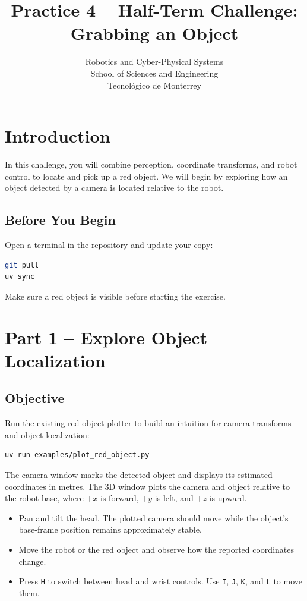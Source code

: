 \documentclass[11pt,a4paper]{article}
\title{\textbf{Practice 4 -- Half-Term Challenge: Grabbing an Object}}
\author{
    Robotics and Cyber-Physical Systems \\
    School of Sciences and Engineering \\
    Tecnol\'ogico de Monterrey
}
\date{}
\begin{document}
\maketitle

\section*{Introduction}

In this challenge, you will combine perception, coordinate transforms, and
robot control to locate and pick up a red object. We will begin by exploring
how an object detected by a camera is located relative to the robot.

\subsection*{Before You Begin}

Open a terminal in the repository and update your copy:

\begin{lstlisting}[language=bash]
git pull
uv sync
\end{lstlisting}

Make sure a red object is visible before starting the exercise.

\section*{Part 1 -- Explore Object Localization}

\subsection*{Objective}

Run the existing red-object plotter to build an intuition for camera
transforms and object localization:

\begin{lstlisting}[language=bash]
uv run examples/plot_red_object.py
\end{lstlisting}

The camera window marks the detected object and displays its estimated
coordinates in metres. The 3D window plots the camera and object relative to
the robot base, where $+x$ is forward, $+y$ is left, and $+z$ is upward.

\begin{itemize}
    \item Pan and tilt the head. The plotted camera should move while the
          object's base-frame position remains approximately stable.
    \item Move the robot or the red object and observe how the reported
          coordinates change.
    \item Press \texttt{H} to switch between head and wrist controls. Use
          \texttt{I}, \texttt{J}, \texttt{K}, and \texttt{L} to move them.
\end{itemize}
\end{document}

